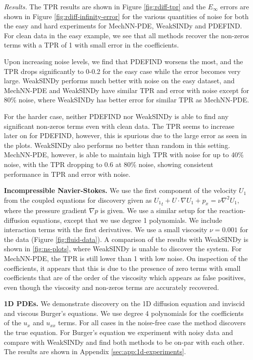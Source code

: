 \emph{Results.} The TPR results are shown in Figure \ref{fig:rdiff-tpr} and the $E_\infty$ errors are shown in Figure \ref{fig:rdiff-infinity-error} for the various quantities of noise for both the easy and hard experiments for MechNN-PDE, WeakSINDy and PDEFIND.
For clean data in the easy example, we see that all methods recover the non-zeros terms with a TPR of 1 with small error in the coefficients.

Upon increasing noise levels, we find that PDEFIND worsens the most, and the TPR drops significantly to 0-0.2 for the easy case while the error becomes very large.
WeakSINDy performs much better with noise on the easy dataset, and MechNN-PDE and WeakSINDy have similar TPR and error with noise except for 80\% noise, where WeakSINDy has better error for similar TPR as MechNN-PDE. 

For the harder case, neither PDEFIND nor WeakSINDy is able to find any significant non-zeros terms even with clean data.
The TPR seems to increase later on for PDEFIND, however, this is spurious due to the large error as seen in the plots.
WeakSINDy also performs no better than random in this setting.
MechNN-PDE, however, is able to maintain high TPR with noise for up to 40\% noise, with the TPR dropping to 0.6 at 80\% noise, showing consistent performance in TPR and error with noise.

\textbf{Incompressible Navier-Stokes.} We use the first component of the velocity $U_1$ from the coupled equations for discovery given as $  {U_1}_t + U\cdot \nabla U_1 + p_x = \nu \nabla^2 U_1,$ where the pressure gradient $\nabla p$ is given.
We use a similar setup for the reaction-diffusion equations, except that we use degree 1 polynomials. We include interaction terms with the first derivatives.
We use a small viscosity $\nu=0.001$ for the data (Figure \ref{fig:fluid-data}).
A comparison of the results with WeakSINDy is shown in \ref{fig:ns-plots}, where WeakSINDy is unable to discover the system.
For MechNN-PDE, the TPR is still lower than 1 with low noise.
On inspection of the coefficients, it appears that this is due to the presence of zero terms with small coefficients that are of the order of the viscosity which appears as false positives, even though the viscosity and non-zeros terms are accurately recovered.

\textbf{1D PDEs.} We demonstrate discovery on the 1D diffusion equation and inviscid and viscous Burger's equations. 
We use degree 4 polynomials for the coefficients of the $u_x$ and $u_{xx}$ terms.
For all cases in the noise-free case the method discovers the true equation. 
For Burger's equation we experiment with noisy data and compare with WeakSINDy and find both methods to be on-par with each other.
The results are shown in Appendix \ref{sec:app:1d-experiments}.

